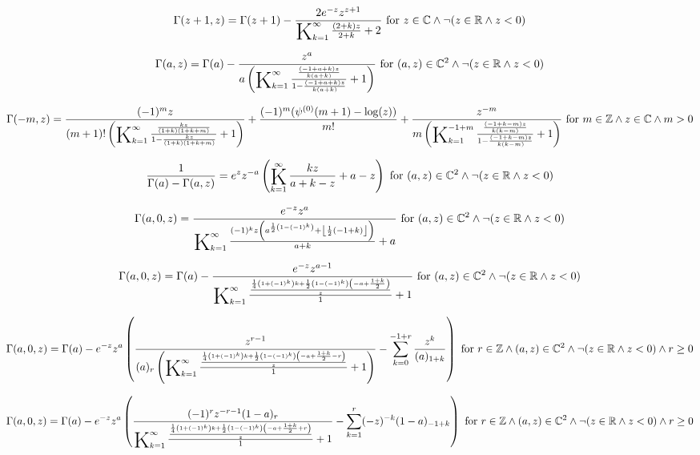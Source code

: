 \documentclass{article}
\newcommand{\bigK}{\mathop{\raisebox{-5pt}{\huge K}}}
\begin{document}
\[\Gamma (z+1,z)=\Gamma (z+1)-\frac{2 e^{-z} z^{z+1}}{\bigK_{k=1}^{\infty}\frac{(2+k) z}{2+k}+2}\text{ for }z\in \mathbb{C}\land \neg (z\in \mathbb{R}\land z<0)\] 

\[\Gamma (a,z)=\Gamma (a)-\frac{z^a}{a \left(\bigK_{k=1}^{\infty}\frac{\frac{(-1+a+k) z}{k (a+k)}}{1-\frac{(-1+a+k) z}{k (a+k)}}+1\right)}\text{ for }(a,z)\in \mathbb{C}^2\land \neg (z\in \mathbb{R}\land z<0)\] 

\[\Gamma (-m,z)=\frac{(-1)^m z}{(m+1)! \left(\bigK_{k=1}^{\infty}\frac{\frac{k z}{(1+k) (1+k+m)}}{1-\frac{k z}{(1+k) (1+k+m)}}+1\right)}+\frac{(-1)^m (\psi ^{(0)}(m+1)-\log (z))}{m!}+\frac{z^{-m}}{m \left(\bigK_{k=1}^{-1+m}\frac{\frac{(-1+k-m) z}{k (k-m)}}{1-\frac{(-1+k-m) z}{k (k-m)}}+1\right)}\text{ for }m\in \mathbb{Z}\land z\in \mathbb{C}\land m>0\] 

\[\frac{1}{\Gamma (a)-\Gamma (a,z)}=e^z z^{-a} \left(\bigK_{k=1}^{\infty}\frac{k z}{a+k-z}+a-z\right)\text{ for }(a,z)\in \mathbb{C}^2\land \neg (z\in \mathbb{R}\land z<0)\] 

\[\Gamma (a,0,z)=\frac{e^{-z} z^a}{\bigK_{k=1}^{\infty}\frac{(-1)^k z \left(a^{\frac{1}{2} \left(1-(-1)^k\right)}+\left\lfloor \frac{1}{2} (-1+k)\right\rfloor \right)}{a+k}+a}\text{ for }(a,z)\in \mathbb{C}^2\land \neg (z\in \mathbb{R}\land z<0)\] 

\[\Gamma (a,0,z)=\Gamma (a)-\frac{e^{-z} z^{a-1}}{\bigK_{k=1}^{\infty}\frac{\frac{\frac{1}{4} \left(1+(-1)^k\right) k+\frac{1}{2} \left(1-(-1)^k\right) \left(-a+\frac{1+k}{2}\right)}{z}}{1}+1}\text{ for }(a,z)\in \mathbb{C}^2\land \neg (z\in \mathbb{R}\land z<0)\] 

\[\Gamma (a,0,z)=\Gamma (a)-e^{-z} z^a \left(\frac{z^{r-1}}{(a)_r \left(\bigK_{k=1}^{\infty}\frac{\frac{\frac{1}{4} \left(1+(-1)^k\right) k+\frac{1}{2} \left(1-(-1)^k\right) \left(-a+\frac{1+k}{2}-r\right)}{z}}{1}+1\right)}-\sum _{k=0}^{-1+r} \frac{z^k}{(a)_{1+k}}\right)\text{ for }r\in \mathbb{Z}\land (a,z)\in \mathbb{C}^2\land \neg (z\in \mathbb{R}\land z<0)\land r\geq 0\] 

\[\Gamma (a,0,z)=\Gamma (a)-e^{-z} z^a \left(\frac{(-1)^r z^{-r-1} (1-a)_r}{\bigK_{k=1}^{\infty}\frac{\frac{\frac{1}{4} \left(1+(-1)^k\right) k+\frac{1}{2} \left(1-(-1)^k\right) \left(-a+\frac{1+k}{2}+r\right)}{z}}{1}+1}-\sum _{k=1}^r (-z)^{-k} (1-a)_{-1+k}\right)\text{ for }r\in \mathbb{Z}\land (a,z)\in \mathbb{C}^2\land \neg (z\in \mathbb{R}\land z<0)\land r\geq 0\] 
\end{document}
